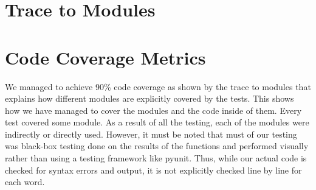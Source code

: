 \documentclass[12pt, titlepage]{article}
\begin{document}
\section{Trace to Modules}    


\section{Code Coverage Metrics}
We managed to achieve 90\% code coverage as shown by the trace to modules that explains how different modules are explicitly covered by the tests. This shows how we have managed to cover the modules and the code inside of them. Every test covered some module. As a result of all the testing, each of the modules were indirectly or directly used. However, it must be noted that must of our testing was black-box testing done on the results of the functions and performed visually rather than using a testing framework like pyunit. Thus, while our actual code is checked for syntax errors and output, it is not explicitly checked line by line for each word. 
\end{document}
